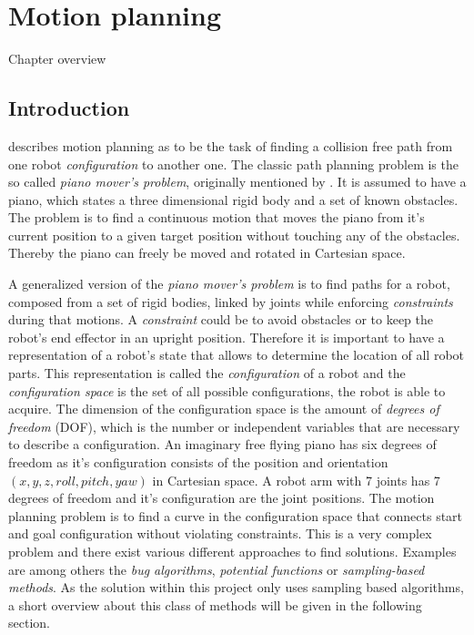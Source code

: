 
\chapter{Motion planning}
Chapter overview

\section{Introduction}

\citep[p. 1--11]{choset2005} describes motion planning as to be the task of finding a collision free path from one robot \emph{configuration} to another one. The classic path planning problem is the so called \emph{piano mover's problem}, originally mentioned by \cite{schwartz1983}. It is assumed to have a piano, which states a three dimensional rigid body and a set of known obstacles. The problem is to find a continuous motion that moves the piano from it's current position to a given target position without touching any of the obstacles. Thereby the piano can freely be moved and rotated in Cartesian space. 

A generalized version of the \emph{piano mover's problem} is to find paths for a robot, composed from a set of rigid bodies, linked by joints while enforcing \emph{constraints} during that motions. A \emph{constraint} could be to avoid obstacles or to keep the robot's end effector in an upright position. Therefore it is important to have a representation of a robot's state that allows to determine the location of all robot parts. This representation is called the \emph{configuration} of a robot and the \emph{configuration space} is the set of all possible configurations, the robot is able to acquire. The dimension of the configuration space is the amount of \emph{degrees of freedom} (DOF), which is the number or independent variables that are necessary to describe a configuration. An imaginary free flying piano has six degrees of freedom as it's configuration consists of the position and orientation $(x,y,z,roll,pitch,yaw)$ in Cartesian space. A robot arm with 7 joints has 7 degrees of freedom and it's configuration are the joint positions. The motion planning problem is to find a curve in the configuration space that connects start and goal configuration without violating constraints. This is a very complex problem and there exist various different approaches to find solutions. Examples are among others the \emph{bug algorithms}\citep[chapter 2]{choset2005}, \emph{potential functions}\citep[chapter 4]{choset2005} or \emph{sampling-based methods}\citep[chapter 7]{choset2005}. As the solution within this project only uses sampling based algorithms, a short overview about this class of methods will be given in the following section.

